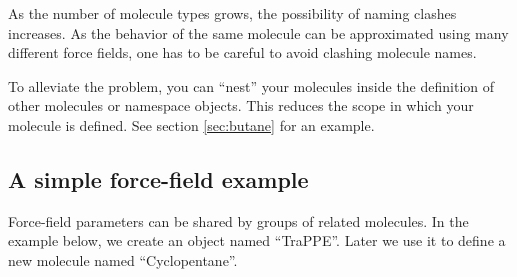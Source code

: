 \documentclass[11pt]{article}
\begin{document}
As the number of molecule types grows, 
the possibility of naming clashes increases. 
As the behavior of the same molecule can be approximated 
using many different force fields, 
one has to be careful to avoid clashing molecule names.

To alleviate the problem, you can ``nest'' your 
molecules inside the definition of other molecules or 
namespace objects.
This reduces the scope in which your molecule is defined.
See section \ref{sec:butane} for an example.


\subsection{A simple force-field example}
\label{sec:force_field_example_trappe}
Force-field parameters can be shared by groups of related molecules.
In the example below, we create an object named ``TraPPE''.
Later we use it to define a new molecule named ``Cyclopentane''.
\end{document}
